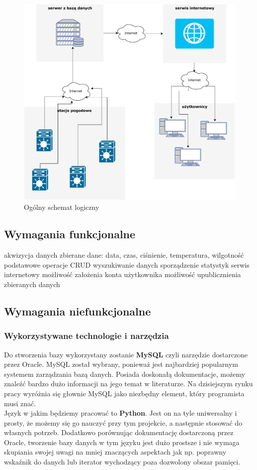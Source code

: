 \documentclass{article}
\begin{document}
    \begin{figure}[h]
        \centering
        \includegraphics[width=0.5\linewidth]{ogolne.pdf}
        \caption{Ogólny schemat logiczny}
        \label{fig:schemat}
    \end{figure}
\newpage
\subsection{Wymagania funkcjonalne}
    \begin{outline}
        \1 akwizycja danych 
            \2 zbierane dane: data, czas, ciśnienie, temperatura, wilgotność
            \2 podstawowe operacje CRUD
            \2 wyszukiwanie danych
            \2 sporządzenie statystyk
        \1 serwis internetowy
            \2 możliwość założenia konta użytkownika
            \2 możliwość upublicznienia zbieranych danych
    \end{outline}
\subsection{Wymagania niefunkcjonalne}
\subsubsection{Wykorzystywane technologie i narzędzia}
    Do stworzenia bazy wykorzystany zostanie \textbf{MySQL} czyli narzędzie dostarczone przez Oracle. MySQL został wybrany, ponieważ jest najbardziej popularnym systemem zarządzania bazą danych. Posiada doskonałą dokumentacje, możemy znaleźć bardzo dużo informacji na jego temat w literaturze. Na dzisiejszym rynku pracy wyróżnia się głownie MySQL jako niezbędny element, który programista musi znać.\\
    Język w jakim będziemy pracować to \textbf{Python}. Jest on na tyle uniwersalny i prosty, że możemy się go nauczyć przy tym projekcie, a następnie stosować do własnych potrzeb. Dodatkowo porównując dokumentację dostarczoną przez Oracle, tworzenie bazy danych w tym języku jest dużo prostsze i nie wymaga skupiania swojej uwagi na mniej znaczących aspektach jak np. poprawny wskaźnik do danych lub iterator wychodzący poza dozwolony obszar pamięci.
\end{document}
